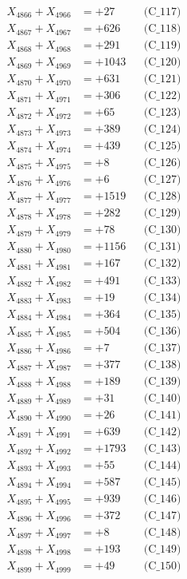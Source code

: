 \documentclass[a4paper,10pt]{article}
\begin{document}
{\begin{align}
X_{4866} + X_{4966} &= +27 && \text{(C\_117)} \\
X_{4867} + X_{4967} &= +626 && \text{(C\_118)} \\
X_{4868} + X_{4968} &= +291 && \text{(C\_119)} \\
X_{4869} + X_{4969} &= +1043 && \text{(C\_120)} \\
\allowbreak
X_{4870} + X_{4970} &= +631 && \text{(C\_121)} \\
X_{4871} + X_{4971} &= +306 && \text{(C\_122)} \\
X_{4872} + X_{4972} &= +65 && \text{(C\_123)} \\
X_{4873} + X_{4973} &= +389 && \text{(C\_124)} \\
X_{4874} + X_{4974} &= +439 && \text{(C\_125)} \\
\allowbreak
X_{4875} + X_{4975} &= +8 && \text{(C\_126)} \\
X_{4876} + X_{4976} &= +6 && \text{(C\_127)} \\
X_{4877} + X_{4977} &= +1519 && \text{(C\_128)} \\
X_{4878} + X_{4978} &= +282 && \text{(C\_129)} \\
X_{4879} + X_{4979} &= +78 && \text{(C\_130)} \\
\allowbreak
X_{4880} + X_{4980} &= +1156 && \text{(C\_131)} \\
X_{4881} + X_{4981} &= +167 && \text{(C\_132)} \\
X_{4882} + X_{4982} &= +491 && \text{(C\_133)} \\
X_{4883} + X_{4983} &= +19 && \text{(C\_134)} \\
X_{4884} + X_{4984} &= +364 && \text{(C\_135)} \\
\allowbreak
X_{4885} + X_{4985} &= +504 && \text{(C\_136)} \\
X_{4886} + X_{4986} &= +7 && \text{(C\_137)} \\
X_{4887} + X_{4987} &= +377 && \text{(C\_138)} \\
X_{4888} + X_{4988} &= +189 && \text{(C\_139)} \\
X_{4889} + X_{4989} &= +31 && \text{(C\_140)} \\
\allowbreak
X_{4890} + X_{4990} &= +26 && \text{(C\_141)} \\
X_{4891} + X_{4991} &= +639 && \text{(C\_142)} \\
X_{4892} + X_{4992} &= +1793 && \text{(C\_143)} \\
X_{4893} + X_{4993} &= +55 && \text{(C\_144)} \\
X_{4894} + X_{4994} &= +587 && \text{(C\_145)} \\
\allowbreak
X_{4895} + X_{4995} &= +939 && \text{(C\_146)} \\
X_{4896} + X_{4996} &= +372 && \text{(C\_147)} \\
X_{4897} + X_{4997} &= +8 && \text{(C\_148)} \\
X_{4898} + X_{4998} &= +193 && \text{(C\_149)} \\
X_{4899} + X_{4999} &= +49 && \text{(C\_150)} \\
\end{align}
}
\end{document}
